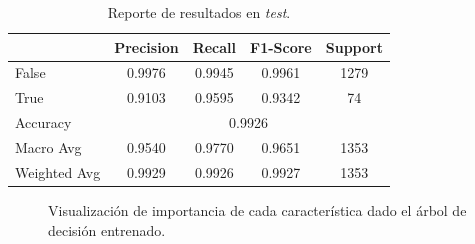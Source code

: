 \documentclass[12pt,letterpaper]{article}
\begin{document}
\begin{table}[htp]
    \centering
    \begin{tabular}{lcccc}
        \hline
        & \textbf{Precision} & \textbf{Recall} & \textbf{F1-Score} & \textbf{Support} \\ \hline
        False & 0.9976 & 0.9945 & 0.9961 & 1279 \\
        True & 0.9103 & 0.9595 & 0.9342 & 74 \\ \hline
        Accuracy & \multicolumn{4}{c}{0.9926} \\
        Macro Avg & 0.9540 & 0.9770 & 0.9651 & 1353 \\
        Weighted Avg & 0.9929 & 0.9926 & 0.9927 & 1353 \\ \hline
    \end{tabular}
    \caption{Reporte de resultados en \textit{test}.}
    \label{tab:results_decision_tree_test}
\end{table}

\begin{figure}[htp]
    \centering
    \caption{Visualización de importancia de cada característica dado el árbol de decisión entrenado.}
    \label{fig:feature_importance}
\end{figure}
\end{document}
